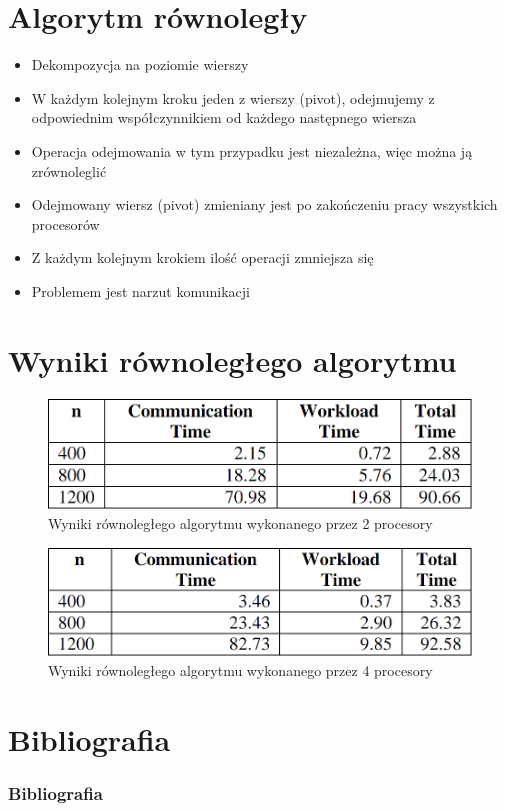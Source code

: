 \documentclass{beamer}
\begin{document}
	\section{Algorytm równoległy}
	\begin{frame}
		\begin{itemize}
			\item Dekompozycja na poziomie wierszy
			\item W każdym kolejnym kroku jeden z wierszy (pivot), odejmujemy z odpowiednim współczynnikiem od każdego następnego wiersza
			\item Operacja odejmowania w tym przypadku jest niezależna, więc można ją zrównoleglić
			\item Odejmowany wiersz (pivot) zmieniany jest po zakończeniu pracy wszystkich procesorów
			\item Z każdym kolejnym krokiem ilość operacji zmniejsza się
			\item Problemem jest narzut komunikacji
		\end{itemize}
	\end{frame}
	\section{Wyniki równoległego algorytmu}
	\begin{frame}
		\begin{figure}
			\includegraphics[scale=0.3]{gfx/mpi_2proc.png}
			\caption{ Wyniki równoległego algorytmu wykonanego przez 2 procesory \cite{pge} }
		\end{figure}
		\begin{figure}
			\includegraphics[scale=0.3]{gfx/mpi_4proc.png}
			\caption{ Wyniki równoległego algorytmu wykonanego przez 4 procesory \cite{pge} }
		\end{figure}
	\end{frame}

	\section{Bibliografia}
		\begin{frame}
		\frametitle{Bibliografia}
			\begin{thebibliography}{1}
			\end{thebibliography}
		\end{frame}
		
\end{document}
